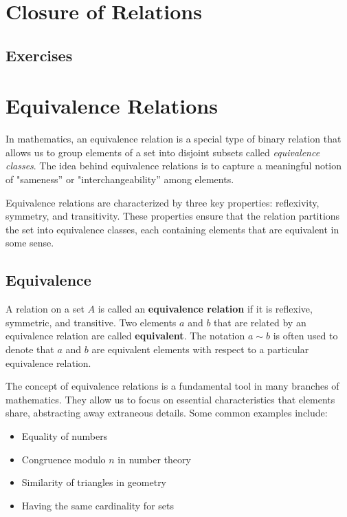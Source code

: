 \section{Closure of Relations}

\subsection{Exercises}

\section{Equivalence Relations}
In mathematics, an equivalence relation is a special type of binary relation that allows us to group elements of a set into disjoint subsets called \textit{equivalence classes}. The idea behind equivalence relations is to capture a meaningful notion of "sameness'' or "interchangeability'' among elements.

Equivalence relations are characterized by three key properties: reflexivity, symmetry, and transitivity. These properties ensure that the relation partitions the set into equivalence classes, each containing elements that are equivalent in some sense.

\subsection{Equivalence}
\begin{definition}
	A relation on a set $A$ is called an \textbf{equivalence relation} if it is reflexive, symmetric, and
	transitive. Two elements $a$ and $b$ that are related by an equivalence relation are called \textbf{equivalent}. The notation $a\sim b$ is often used to denote that $a$ and $b$ are equivalent elements with respect to a particular equivalence relation.
\end{definition}
The concept of equivalence relations is a fundamental tool in many branches of mathematics. They allow us to focus on essential characteristics that elements share, abstracting away extraneous details. Some common examples include:

\begin{itemize}
	\item Equality of numbers
	\item Congruence modulo $n$ in number theory
	\item Similarity of triangles in geometry
	\item Having the same cardinality for sets
\end{itemize}

